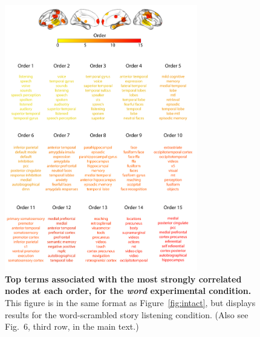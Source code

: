 \documentclass{article}
\newcommand{\neurosynth}{6}
\begin{document}
\begin{figure}[p!]
\centering
\includegraphics[width=0.75\textwidth]{figs/supp_15_word}
\caption{\textbf{Top terms associated with the most strongly
      correlated nodes at each order, for the \textit{word} experimental
    condition.}  This figure is in the same format as
  Figure~\ref{fig:intact}, but displays results for the
  word-scrambled story listening condition.  (Also see Fig.~\neurosynth,
third row, in the main text.)}
\label{fig:word}
\end{figure}
\end{document}
